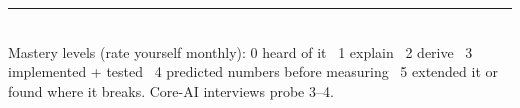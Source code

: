 \vfill
\begin{center}
{\color{rule}\rule{0.6\columnwidth}{0.4pt}}\\[2pt]
{\scriptsize\color{mute}Mastery levels (rate yourself monthly): 0 heard of it \textperiodcentered\ 1 explain \textperiodcentered\ 2 derive \textperiodcentered\ 3 implemented + tested \textperiodcentered\ 4 predicted numbers before measuring \textperiodcentered\ 5 extended it or found where it breaks. Core-AI interviews probe 3--4.}
\end{center}
